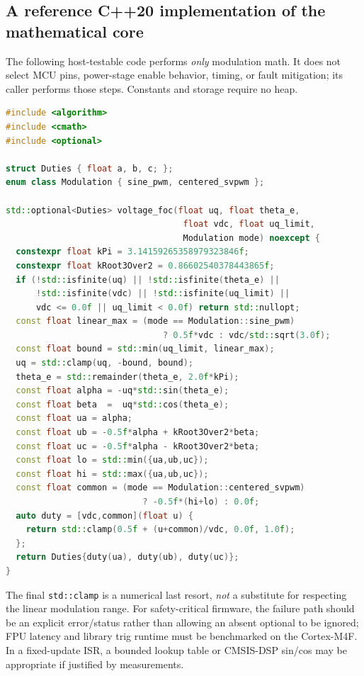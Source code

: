 \documentclass[10pt,letterpaper]{article}
\begin{document}
\subsection{A reference C++20 implementation of the mathematical core}
The following host-testable code performs \emph{only} modulation math. It does not select MCU pins, power-stage enable behavior, timing, or fault mitigation; its caller performs those steps. Constants and storage require no heap.
\begin{lstlisting}[language=C++,caption={Pure modulation core: signed voltage-mode FOC}]
#include <algorithm>
#include <cmath>
#include <optional>

struct Duties { float a, b, c; };
enum class Modulation { sine_pwm, centered_svpwm };

std::optional<Duties> voltage_foc(float uq, float theta_e,
                                   float vdc, float uq_limit,
                                   Modulation mode) noexcept {
  constexpr float kPi = 3.14159265358979323846f;
  constexpr float kRoot3Over2 = 0.86602540378443865f;
  if (!std::isfinite(uq) || !std::isfinite(theta_e) ||
      !std::isfinite(vdc) || !std::isfinite(uq_limit) ||
      vdc <= 0.0f || uq_limit < 0.0f) return std::nullopt;
  const float linear_max = (mode == Modulation::sine_pwm)
                               ? 0.5f*vdc : vdc/std::sqrt(3.0f);
  const float bound = std::min(uq_limit, linear_max);
  uq = std::clamp(uq, -bound, bound);
  theta_e = std::remainder(theta_e, 2.0f*kPi);
  const float alpha = -uq*std::sin(theta_e);
  const float beta  =  uq*std::cos(theta_e);
  const float ua = alpha;
  const float ub = -0.5f*alpha + kRoot3Over2*beta;
  const float uc = -0.5f*alpha - kRoot3Over2*beta;
  const float lo = std::min({ua,ub,uc});
  const float hi = std::max({ua,ub,uc});
  const float common = (mode == Modulation::centered_svpwm)
                           ? -0.5f*(hi+lo) : 0.0f;
  auto duty = [vdc,common](float u) {
    return std::clamp(0.5f + (u+common)/vdc, 0.0f, 1.0f);
  };
  return Duties{duty(ua), duty(ub), duty(uc)};
}
\end{lstlisting}
The final \texttt{std::clamp} is a numerical last resort, \emph{not} a substitute for respecting the linear modulation range. For safety-critical firmware, the failure path should be an explicit error/status rather than allowing an absent optional to be ignored; FPU latency and library trig runtime must be benchmarked on the Cortex-M4F. In a fixed-update ISR, a bounded lookup table or CMSIS-DSP sin/cos may be appropriate if justified by measurements.
\end{document}
